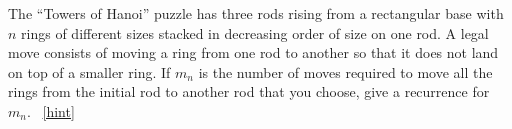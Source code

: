 \documentclass{book}
\begin{document}
\setcounter{project}{137}
\addtocounter{project}{-1}
\begin{activity}[]\label{HanoiProblem}
\hypertarget{p-939}{}%
The ``Towers of Hanoi'' puzzle has three rods rising from a rectangular base with \(n\) rings of different sizes stacked in decreasing order of size on one rod. A legal move consists of moving a ring from one rod to another so that it does not land on top of a smaller ring. If \(m_n\) is the number of moves required to move all the rings from the initial rod to another rod that you choose, give a recurrence for \(m_n\).%
~\hfill{\tiny\hyperlink{a-137}{[hint]}\hypertarget{q-137}{}}\end{activity}
\end{document}
